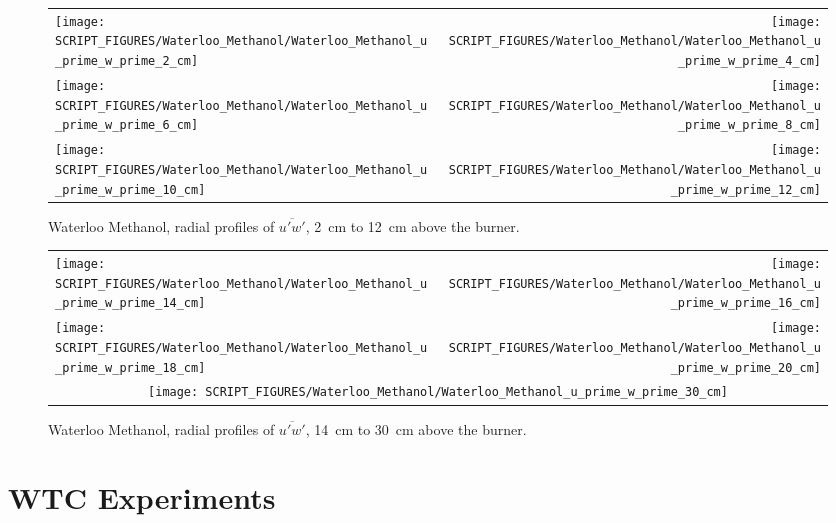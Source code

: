 \begin{figure}[p]
\begin{tabular*}{\textwidth}{l@{\extracolsep{\fill}}r}
\texttt{[image: SCRIPT\_FIGURES/Waterloo\_Methanol/Waterloo\_Methanol\_u\_prime\_w\_prime\_2\_cm]} &
\texttt{[image: SCRIPT\_FIGURES/Waterloo\_Methanol/Waterloo\_Methanol\_u\_prime\_w\_prime\_4\_cm]} \\
\texttt{[image: SCRIPT\_FIGURES/Waterloo\_Methanol/Waterloo\_Methanol\_u\_prime\_w\_prime\_6\_cm]} &
\texttt{[image: SCRIPT\_FIGURES/Waterloo\_Methanol/Waterloo\_Methanol\_u\_prime\_w\_prime\_8\_cm]} \\
\texttt{[image: SCRIPT\_FIGURES/Waterloo\_Methanol/Waterloo\_Methanol\_u\_prime\_w\_prime\_10\_cm]} &
\texttt{[image: SCRIPT\_FIGURES/Waterloo\_Methanol/Waterloo\_Methanol\_u\_prime\_w\_prime\_12\_cm]}
\end{tabular*}
\caption[Waterloo Methanol, radial profiles of $\overline{u'w'}$, 2~cm to 12~cm above the burner]
{Waterloo Methanol, radial profiles of $\overline{u'w'}$, 2~cm to 12~cm above the burner.}
\label{Water_Methanol_upwp_1}
\end{figure}

\begin{figure}[p]
\begin{tabular*}{\textwidth}{l@{\extracolsep{\fill}}r}
\texttt{[image: SCRIPT\_FIGURES/Waterloo\_Methanol/Waterloo\_Methanol\_u\_prime\_w\_prime\_14\_cm]} &
\texttt{[image: SCRIPT\_FIGURES/Waterloo\_Methanol/Waterloo\_Methanol\_u\_prime\_w\_prime\_16\_cm]} \\
\texttt{[image: SCRIPT\_FIGURES/Waterloo\_Methanol/Waterloo\_Methanol\_u\_prime\_w\_prime\_18\_cm]} &
\texttt{[image: SCRIPT\_FIGURES/Waterloo\_Methanol/Waterloo\_Methanol\_u\_prime\_w\_prime\_20\_cm]} \\
\multicolumn{2}{c}{\texttt{[image: SCRIPT\_FIGURES/Waterloo\_Methanol/Waterloo\_Methanol\_u\_prime\_w\_prime\_30\_cm]}}
\end{tabular*}
\caption[Waterloo Methanol, radial profiles of $\overline{u'w'}$, 14~cm to 30~cm above the burner]
{Waterloo Methanol, radial profiles of $\overline{u'w'}$, 14~cm to 30~cm above the burner.}
\label{Water_Methanol_upwp_2}
\end{figure}

\clearpage


\section{WTC Experiments}

